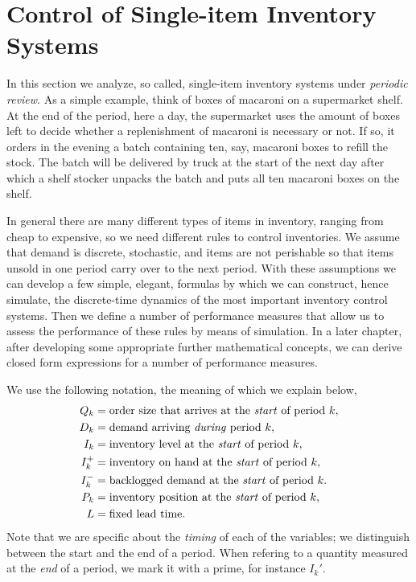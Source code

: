 \documentclass[stochastic-or.tex]{subfiles}
\begin{document}
\section{Control of Single-item Inventory Systems}
\label{sec:single-item-invent}

In this section we analyze, so called, single-item inventory systems under \emph{periodic review}.
As a simple example, think of boxes of macaroni on a supermarket shelf.
At the end of the period, here a day, the supermarket uses the amount of boxes left to decide whether a replenishment of macaroni is necessary or not.
If so, it orders in the evening a batch containing ten, say, macaroni boxes to refill the stock.
The batch will be delivered by truck at the start of the next day after which a shelf stocker unpacks the batch and puts all ten macaroni boxes on the shelf.

In general there are many different types of items in inventory, ranging from cheap to expensive, so we need different rules to control inventories.
We assume that demand is discrete, stochastic, and items are not perishable so that items unsold in one period carry over to the next period.
With these assumptions we can develop a few simple, elegant, formulas by which we can construct, hence simulate, the discrete-time dynamics of the most important inventory control systems.
Then we define a number of performance measures that allow us to assess the performance of these rules by means of simulation.
In a later chapter, after developing some appropriate further mathematical concepts, we can derive closed form expressions for a number of performance measures.


We use the following notation, the meaning of which we explain below,
\begin{align*}
  Q_k &= \text{order size that arrives at  the \emph{start} of period~$k$}, \\
  D_k &= \text{demand arriving \emph{during} period~$k$}, \\
  I_k &= \text{inventory level at the \emph{start} of period~$k$}, \\
I_k^+ &= \text{inventory on hand at the \emph{start} of period~$k$}, \\
I_k^- &= \text{backlogged demand at the \emph{start} of period~$k$}. \\
  P_k &= \text{inventory position at the \emph{start} of period~$k$}, \\
  L &= \text{fixed lead time}.
\end{align*}
Note  that we are specific about the \emph{timing} of each of the  variables; we distinguish between the start and the end of a period. When refering to a quantity measured at the \emph{end} of a period, we mark it with a prime, for instance $I_k'$.
\end{document}
